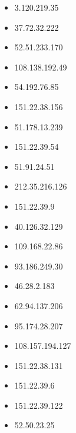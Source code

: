 \documentclass{article}
\begin{document}
\begin{itemize}
            \item 3.120.219.35
        
            \item 37.72.32.222
        
            \item 52.51.233.170
        
            \item 108.138.192.49
        
            \item 54.192.76.85
        
            \item 151.22.38.156
        
            \item 51.178.13.239
        
            \item 151.22.39.54
        
            \item 51.91.24.51
        
            \item 212.35.216.126
        
            \item 151.22.39.9
        
            \item 40.126.32.129
        
            \item 109.168.22.86
        
            \item 93.186.249.30
        
            \item 46.28.2.183
        
            \item 62.94.137.206
        
            \item 95.174.28.207
        
            \item 108.157.194.127
        
            \item 151.22.38.131
        
            \item 151.22.39.6
        
            \item 151.22.39.122
        
            \item 52.50.23.25
        

\end{itemize}
\end{document}
